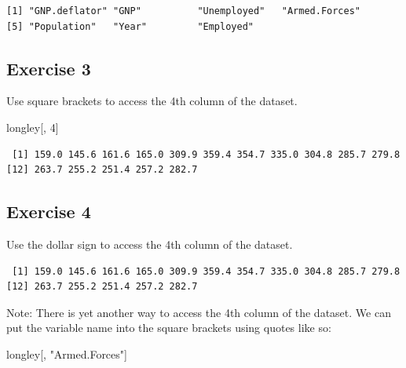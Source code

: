 \documentclass[]{book}
\newenvironment{Shaded}{\begin{snugshade}}{\end{snugshade}}
\newcommand{\DecValTok}[1]{\textcolor[rgb]{0.00,0.00,0.81}{#1}}
\newcommand{\StringTok}[1]{\textcolor[rgb]{0.31,0.60,0.02}{#1}}
\newcommand{\OperatorTok}[1]{\textcolor[rgb]{0.81,0.36,0.00}{\textbf{#1}}}
\newcommand{\NormalTok}[1]{#1}
\theoremstyle{definition}
\theoremstyle{definition}
\theoremstyle{definition}
\theoremstyle{remark}
\begin{document}
\begin{verbatim}
[1] "GNP.deflator" "GNP"          "Unemployed"   "Armed.Forces"
[5] "Population"   "Year"         "Employed"    
\end{verbatim}

\subsection{Exercise 3}\label{exercise-3-1}

Use square brackets to access the 4th column of the dataset.

\begin{Shaded}
\begin{Highlighting}[]
\NormalTok{longley[, }\DecValTok{4}\NormalTok{]}
\end{Highlighting}
\end{Shaded}

\begin{verbatim}
 [1] 159.0 145.6 161.6 165.0 309.9 359.4 354.7 335.0 304.8 285.7 279.8
[12] 263.7 255.2 251.4 257.2 282.7
\end{verbatim}

\subsection{Exercise 4}\label{exercise-4-1}

Use the dollar sign to access the 4th column of the dataset.

\begin{Shaded}
\end{Shaded}

\begin{verbatim}
 [1] 159.0 145.6 161.6 165.0 309.9 359.4 354.7 335.0 304.8 285.7 279.8
[12] 263.7 255.2 251.4 257.2 282.7
\end{verbatim}

Note: There is yet another way to access the 4th column of the dataset.
We can put the variable name into the square brackets using quotes like
so:

\begin{Shaded}
\begin{Highlighting}[]
\NormalTok{longley[, }\StringTok{"Armed.Forces"}\NormalTok{]}
\end{Highlighting}
\end{Shaded}
\end{document}
